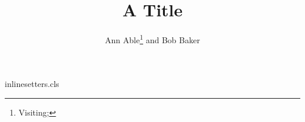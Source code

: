 \begin{filecontents*}[overwrite]{inlinesetters.cls}
\def\affil#1{$^{#1}$\ignorespaces}
\newcommand{\email}[1]{\texttt{#1}}
\newcommand{\institute}[1]{\thanks{#1}}
\newcommand\address[1]{\message{address command no longer supported}}
\end{filecontents*}
\documentclass{inlinesetters}

\title{A Title}
\author{Ann Able\thanks{Visiting; } and Bob Baker}
\address{Old Lab}
\maketitle
Body.

